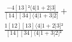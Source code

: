 \documentclass[varwidth, border=5pt]{standalone}
\begin{document}
\begin{my}
$\begin{gathered}
\scriptscriptstyle\frac{-4[13]²⟨4|1+2|3]}{[14][34]⟨4|1+3|2]} +\\
\scriptscriptstyle\frac{1[12][13]⟨4|1+2|3]²}{[14][34]⟨4|1+3|2]²} \phantom{+}
\end{gathered}$
\end{my}
\end{document}
